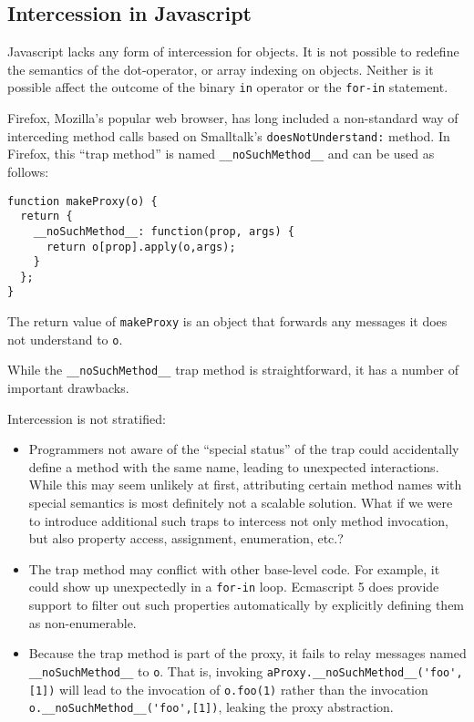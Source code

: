 \documentclass{acm_proc_article-sp}
\begin{document}
\subsection{Intercession in Javascript}
\label{sub:intercession_in_javascript}

Javascript lacks any form of intercession for objects. It is not possible to redefine the semantics of the dot-operator, or array indexing on objects. Neither is it possible affect the outcome of the binary \texttt{in} operator or the \texttt{for-in} statement.

Firefox, Mozilla's popular web browser, has long included a non-standard way of interceding method calls based on Smalltalk's \texttt{doesNotUnderstand:} method. In Firefox, this ``trap method'' is named \lstinline{__noSuchMethod__} and can be used as follows:

\begin{lstlisting}
function makeProxy(o) {
  return {
    __noSuchMethod__: function(prop, args) {
      return o[prop].apply(o,args);
    }
  };
}
\end{lstlisting}

The return value of \texttt{makeProxy} is an object that forwards any messages it does not understand to \texttt{o}.

While the \lstinline{__noSuchMethod__} trap method is straightforward, it has a number of important drawbacks.

Intercession is not stratified:
\begin{itemize}
  \item Programmers not aware of the ``special status'' of the trap could accidentally define a method with the same name, leading to unexpected interactions. While this may seem unlikely at first, attributing certain method names with special semantics is most definitely not a scalable solution. What if we were to introduce additional such traps to intercess not only method invocation, but also property access, assignment, enumeration, etc.?
  
  \item The trap method may conflict with other base-level code. For example, it could show up unexpectedly in a \texttt{for-in} loop. Ecmascript 5 does provide support to filter out such properties automatically by explicitly defining them as non-enumerable.
  
  \item Because the trap method is part of the proxy, it fails to relay messages named \lstinline{__noSuchMethod__} to \texttt{o}. That is, invoking \lstinline{aProxy.__noSuchMethod__('foo',[1])} will lead to the invocation of \lstinline{o.foo(1)} rather than the invocation \lstinline{o.__noSuchMethod__('foo',[1])}, leaking the proxy abstraction.
  
\end{itemize}
\end{document}
